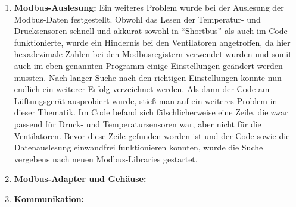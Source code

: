 \begin{enumerate}
	\item \textbf{Modbus-Auslesung: } Ein weiteres Problem wurde bei der Auslesung der Modbus-Daten festgestellt. Obwohl das Lesen der Temperatur- und Drucksensoren schnell und akkurat sowohl in \enquote{Shortbus} als auch im Code funktionierte, wurde ein Hindernis bei den Ventilatoren angetroffen, da hier hexadezimale Zahlen bei den Modbusregistern verwendet wurden und somit auch im eben genannten Programm einige Einstellungen geändert werden mussten. Nach langer Suche nach den richtigen Einstellungen konnte nun endlich ein weiterer Erfolg verzeichnet werden. Als dann der Code am Lüftungsgerät ausprobiert wurde, stieß man auf ein weiteres Problem in dieser Thematik. Im Code befand sich fälschlicherweise eine Zeile, die zwar passend für Druck- und Temperatursensoren war, aber nicht für die Ventilatoren. Bevor diese Zeile gefunden worden ist und der Code sowie die Datenauslesung einwandfrei funktionieren konnten, wurde die Suche vergebens nach neuen Modbus-Libraries gestartet.
	\item \textbf{Modbus-Adapter und Gehäuse: }
	\item \textbf{Kommunikation: }
\end{enumerate}
